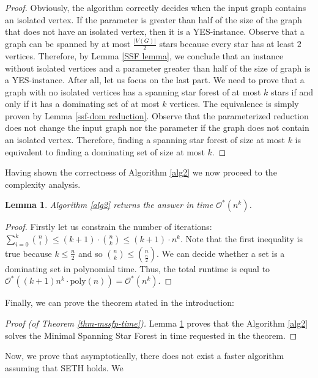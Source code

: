 \documentclass[en]{pracamgr}
\newtheorem{lemma}{Lemma}
\newcommand{\ssf}{spanning star forest}
\newcommand{\mssfp}{{\sc Minimal Spanning Star Forest}}
\begin{document}
\begin{proof}
	Obviously, the algorithm correctly decides when the input graph contains an isolated vertex. If the parameter is greater than half of the size of the graph that does not have an isolated vertex, then it is a YES-instance. Observe that a graph can be spanned by at most $\frac{|V(G)|}{2}$ stars because every star has at least $2$ vertices. Therefore, by Lemma \ref{SSF lemma}, we conclude that an instance without isolated vertices and a parameter greater than half of the size of graph is a YES-instance. After all, let us focus on the last part. We need to prove that a graph with no isolated vertices has a \ssf{} of at most $k$ stars if and only if it has a dominating set of at most $k$ vertices. The equivalence is simply proven by Lemma \ref{ssf-dom reduction}. Observe that the parameterized reduction does not change the input graph nor the parameter if the graph does not contain an isolated vertex. Therefore, finding a \ssf{} of size at most $k$ is equivalent to finding a dominating set of size at most $k$.
\end{proof}

Having shown the correctness of Algorithm \ref{alg2} we now proceed to the complexity analysis.

\begin{lemma}\label{alg2-time}
	Algorithm \ref{alg2} returns the answer in time $\mathcal{O}^*(n^k)$.
\end{lemma}

\begin{proof}
	Firstly let us constrain the number of iterations: $\sum\limits_{i=0}^{k} {n \choose i} \leq (k+1) \cdot {n \choose k} \leq (k+1) \cdot n^k$. Note that the first inequality is true because $k \leq \frac{n}{2}$ and so ${n \choose k} \leq {n  \choose \frac{n}{2}}$. We can decide whether a set is a dominating set in polynomial time. Thus, the total runtime is equal to $\mathcal{O}^*((k+1)n^k \cdot \textrm{poly}(n))=\mathcal{O}^*(n^k)$.
\end{proof}

Finally, we can prove the theorem stated in the introduction:

\begin{proof}[Proof (of Theorem \ref{thm-mssfp-time})]
	Lemma \ref{alg2-time} proves that the Algorithm \ref{alg2} solves the \mssfp{} in time requested in the theorem.
\end{proof}

Now, we prove that asymptotically, there does not exist a faster algorithm assuming that SETH holds. We
\end{document}
